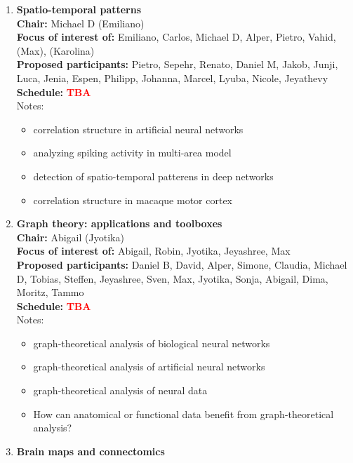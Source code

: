 \documentclass[10pt, a4paper,twoside,american]{article}
\newcommand{\alert}[1]{\textcolor{red}{\bf #1}}
\begin{document}
\begin{enumerate}[resume]
\item {\large\bf Spatio-temporal patterns}\\[1ex]
  {\bf Chair:} Michael D (Emiliano)\\[1ex]
  {\bf Focus of interest of:} Emiliano, Carlos, Michael D, Alper, Pietro, Vahid, (Max), (Karolina)\\[1ex]
  {\bf Proposed participants:} Pietro, Sepehr, Renato, Daniel M, Jakob, Junji, Luca, Jenia, Espen, Philipp, Johanna, Marcel, Lyuba, Nicole, Jeyathevy\\[1ex]
  {\bf Schedule:} \alert{TBA}\\[1ex]
  Notes:
  \begin{itemize}
  \item correlation structure in artificial neural networks
  \item analyzing spiking activity in multi-area model
  \item detection of spatio-temporal patterens in deep networks
  \item correlation structure in macaque motor cortex
  \end{itemize}
\item {\large\bf Graph theory: applications and toolboxes}\\[1ex]
  {\bf Chair:} Abigail (Jyotika)\\[1ex]
  {\bf Focus of interest of:} Abigail, Robin, Jyotika, Jeyashree, Max\\[1ex]
  {\bf Proposed participants:} Daniel B, David, Alper, Simone, Claudia, Michael D, Tobias, Steffen, Jeyashree, Sven, Max, Jyotika, Sonja, Abigail, Dima, Moritz, Tammo\\[1ex]
  {\bf Schedule:} \alert{TBA}\\[1ex]
  Notes:
  \begin{itemize}
  \item graph-theoretical analysis of biological neural networks 
  \item graph-theoretical analysis of artificial neural networks
  \item graph-theoretical analysis of neural data
  \item How can anatomical or functional data benefit from graph-theoretical analysis?
  \end{itemize}
\item {\large\bf Brain maps and connectomics}\\[1ex]

\end{enumerate}
\end{document}
